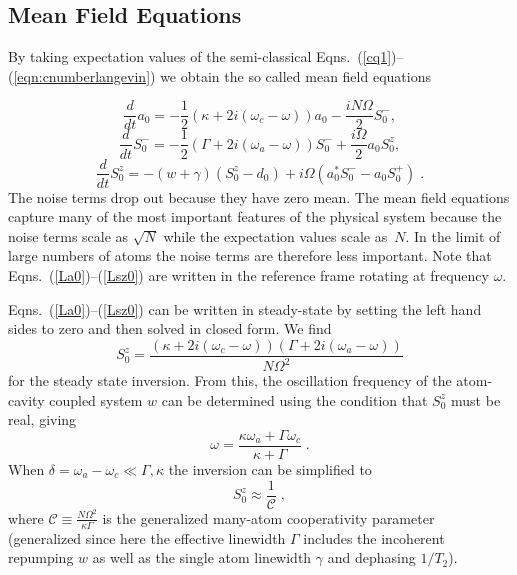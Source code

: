 \documentclass[aps,
twocolumn,
showpacs,
superscriptaddress,groupedaddress]{revtex4}
\begin{document}
\subsection{Mean Field Equations}
\label{MFE}

By taking expectation values of the semi-classical
Eqns.~(\ref{cq1})--(\ref{eqn:cnumberlangevin}) we obtain the so called
mean field equations

\begin{equation}
\frac{d}{dt} a_0= -\frac{1}{2} (\kappa +2i(\omega_c-\omega)) a_0
-\frac{i N \Omega}{2} S_0^{-},
\label{La0}
\end{equation}
\begin{equation}
\frac{d}{dt} S_0^{-} =
-\frac{1}{2} \left(\Gamma +2 i (\omega_a-\omega) \right)  S_0^{-}
+\frac{i \Omega}{2} a_0 S_0^{z},
\end{equation}
\begin{equation}
\frac{d}{dt} S_0^{z} = -(w+\gamma)\left( S_0^{z} - d_0\right)
+i\Omega \left( a_0^{*} S_0^{-} - a_0 S_0^{+} \right)\;.
\label{Lsz0}
\end{equation}
The noise terms drop out because they have zero mean.  The mean field
equations capture many of the most important features of the physical
system because the noise terms scale as $\sqrt{N}$ while the
expectation values scale as~$N$.  In the limit of large numbers of
atoms the noise terms are therefore less important.  Note that
Eqns.~(\ref{La0})--(\ref{Lsz0}) are written in the reference frame
rotating at frequency $\omega$.

Eqns.~(\ref{La0})--(\ref{Lsz0}) can be written in steady-state by
setting the left hand sides to zero and then solved in closed form.
We find
\begin{equation}
S_0^{z}=
\frac{(\kappa+2i(\omega_c-\omega))(\Gamma+2i(\omega_a-\omega))}{N\Omega^2}
\label{Sz01}
\end{equation}
for the steady state inversion. From this, the oscillation frequency
of the atom-cavity coupled system $w$ can be determined using the
condition that $S_0^{z}$ must be real, giving
\begin{equation}
\omega = \frac{\kappa \omega_a + \Gamma \omega_c}{\kappa+\Gamma}\;.
\label{atomcavityfrequencycenter1}
\end{equation}
When $\delta = \omega_a-\omega_c \ll \Gamma,\kappa$ the inversion can be
simplified to
\begin{equation}
S_0^{z}\approx \frac{1}{\mathcal{C}}\;,
\end{equation}
where $\mathcal{C}\equiv \frac{N \Omega^2}{\kappa \Gamma}$ is the
generalized many-atom cooperativity parameter (generalized since here
the effective linewidth $\Gamma$ includes the incoherent repumping $w$
as well as the single atom linewidth $\gamma$ and dephasing $1/T_2$).
\end{document}
